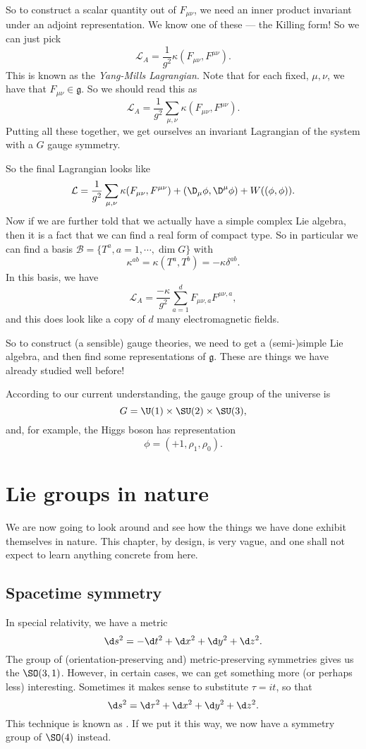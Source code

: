 \documentclass[a4paper]{article}
\begin{document}
So to construct a scalar quantity out of $F_{\mu\nu}$, we need an inner product invariant under an adjoint representation. We know one of these --- the Killing form! So we can just pick
\[
  \mathcal{L}_A = \frac{1}{g^2} \kappa(F_{\mu\nu}, F^{\mu\nu}).
\]
This is known as the \emph{Yang-Mills Lagrangian}. Note that for each fixed, $\mu, \nu$, we have that $F_{\mu\nu} \in \mathfrak{g}$. So we should read this as
\[
  \mathcal{L}_A = \frac{1}{g^2} \sum_{\mu, \nu} \kappa(F_{\mu\nu}, F^{\mu\nu}).
\]
Putting all these together, we get ourselves an invariant Lagrangian of the system with a $G$ gauge symmetry.

So the final Lagrangian looks like
\[
  \mathcal{L} = \frac{1}{g^2} \sum_{\mu, \nu} \kappa(F_{\mu\nu}, F^{\mu\nu}) + (\D_\mu \phi, \D^\mu \phi) + W((\phi, \phi)).
\]
Now if we are further told that we actually have a simple complex Lie algebra, then it is a fact that we can find a real form of compact type. So in particular we can find a basis $\mathcal{B} = \{T^a, a = 1, \cdots, \dim G\}$ with
\[
  \kappa^{ab} = \kappa(T^a, T^b) = - \kappa \delta^{ab}.
\]
In this basis, we have
\[
  \mathcal{L}_A = \frac{-\kappa}{g^2} \sum_{a = 1}^d F_{\mu\nu, a} F^{\mu\nu, a},
\]
and this does look like a copy of $d$ many electromagnetic fields.

So to construct (a sensible) gauge theories, we need to get a (semi-)simple Lie algebra, and then find some representations of $\mathfrak{g}$. These are things we have already studied well before!

According to our current understanding, the gauge group of the universe is
\[
  G = \U(1) \times \SU(2) \times \SU(3),
\]
and, for example, the Higgs boson has representation
\[
  \phi = (+1, \rho_1, \rho_0).
\]

\section{Lie groups in nature}
We are now going to look around and see how the things we have done exhibit themselves in nature. This chapter, by design, is very vague, and one shall not expect to learn anything concrete from here.

\subsection{Spacetime symmetry}
In special relativity, we have a metric
\[
  \d s^2 = -\d t^2 + \d x^2 + \d y^2 + \d z^2.
\]
The group of (orientation-preserving and) metric-preserving symmetries gives us the  $\SO(3, 1)$. However, in certain cases, we can get something more (or perhaps less) interesting. Sometimes it makes sense to substitute $\tau = i t$, so that
\[
  \d s^2 = \d \tau^2 + \d x^2 + \d y^2 + \d z^2.
\]
This technique is known as . If we put it this way, we now have a symmetry group of $\SO(4)$ instead.
\end{document}
